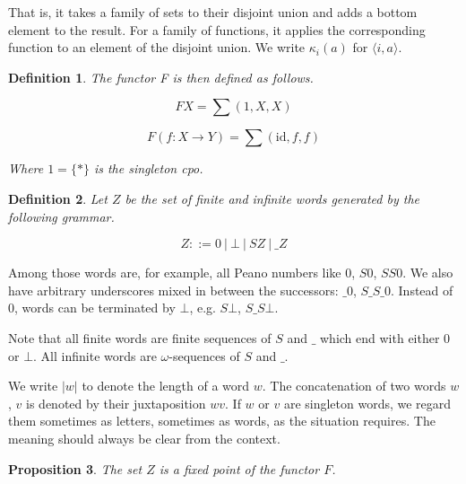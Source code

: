 \documentclass[a4paper]{article}
\newcommand{\arr}{\rightarrow}
\newtheorem{defNuF}{Definition}[section]
\newtheorem{defF}[defNuF]{Definition}
\newtheorem{thmDomNuFisFixedPoint}[defNuF]{Proposition}
\begin{document}
That is, it takes a family of sets to their disjoint union and adds a bottom
element to the result.  For a family of functions, it applies the corresponding
function to an element of the disjoint union.  We write $\kappa_i(a)$ for
$\langle i, a \rangle$.

\begin{defF}

The functor F is then defined as follows.

\begin{equation*}
FX = \sum{(1, X, X)}
\end{equation*}

\begin{equation*}
F(f : X \arr Y) = \sum{(\text{id}, f, f)}
\end{equation*}

Where $1 = \{*\}$ is the singleton cpo.

\end{defF}


\begin{defNuF}

Let $Z$ be the set of finite and infinite words generated by the following
grammar.

\begin{equation*}
Z ::= 0 \ |\ \bot \ |\ S Z \ |\ \_ Z
\end{equation*}

\end{defNuF}

Among those words are, for example, all Peano numbers like $0$, $S0$, $SS0$.
We also have arbitrary underscores mixed in between the successors: $\_0$,
$S\_S\_0$.  Instead of $0$, words can be terminated by $\bot$, e.g.  $S\bot$,
$S\_S\bot$.

Note that all finite words are finite sequences of $S$ and $\_$ which end with
either $0$ or $\bot$. All infinite words are $\omega$-sequences of $S$ and $\_$.

We write $|w|$ to denote the length of a word $w$.  The concatenation of two
words $w$, $v$ is denoted by their juxtaposition $wv$.  If $w$ or $v$ are
singleton words, we regard them sometimes as letters, sometimes as words, as the
situation requires.  The meaning should always be clear from the context.

\begin{thmDomNuFisFixedPoint}

The set $Z$ is a fixed point of the functor $F$.

\end{thmDomNuFisFixedPoint}
\end{document}
